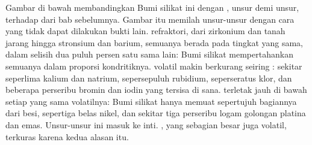 Gambar di bawah membandingkan Bumi silikat ini dengan , unsur demi
unsur, terhadap  dari bab sebelumnya. Gambar itu memilah
unsur-unsur dengan cara yang tidak dapat dilakukan bukti lain. 
refraktori, dari zirkonium dan tanah jarang hingga stronsium dan barium, semuanya
berada pada tingkat yang sama, dalam selisih dua puluh persen satu sama lain: Bumi silikat
mempertahankan semuanya dalam proporsi kondritiknya.  volatil
makin berkurang seiring : sekitar seperlima kalium
dan natrium, sepersepuluh rubidium, seperseratus klor, dan beberapa
perseribu bromin dan iodin yang tersisa di sana.  terletak jauh di bawah setiap 
yang sama volatilnya: Bumi silikat hanya memuat sepertujuh bagiannya dari
besi, sepertiga belas nikel, dan sekitar tiga perseribu
logam golongan platina dan emas. Unsur-unsur ini masuk ke inti. , yang sebagian besar juga volatil, terkuras karena kedua alasan itu.

